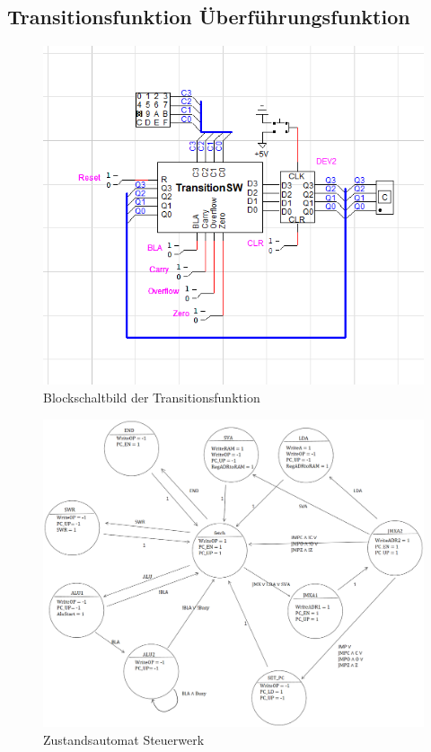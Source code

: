 \subsection{Transitionsfunktion Überführungsfunktion}
\label{sec:transitionsfunktion}

\begin{figure}[ht]
  \centering
  \includegraphics[scale=0.6]
  {content/figures/Transitionsfunktion.png}
  \caption{Blockschaltbild der Transitionsfunktion}
  \label{fig:blockschaltbild-transitionsfunktion}
\end{figure}

\begin{figure}[ht]
  \centering
  \includegraphics[scale=0.279]
  {content/figures/SW_Zustaende}
  \caption{Zustandsautomat Steuerwerk}
  \label{fig:SW_Zustaende}
\end{figure}

